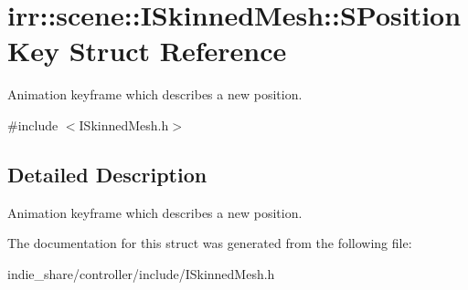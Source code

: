 \hypertarget{structirr_1_1scene_1_1ISkinnedMesh_1_1SPositionKey}{}\section{irr\+:\+:scene\+:\+:I\+Skinned\+Mesh\+:\+:S\+Position\+Key Struct Reference}
\label{structirr_1_1scene_1_1ISkinnedMesh_1_1SPositionKey}


Animation keyframe which describes a new position.  




{\ttfamily \#include $<$I\+Skinned\+Mesh.\+h$>$}



\subsection{Detailed Description}
Animation keyframe which describes a new position. 

The documentation for this struct was generated from the following file\+:\begin{DoxyCompactItemize}
\item 
indie\+\_\+share/controller/include/I\+Skinned\+Mesh.\+h\end{DoxyCompactItemize}
